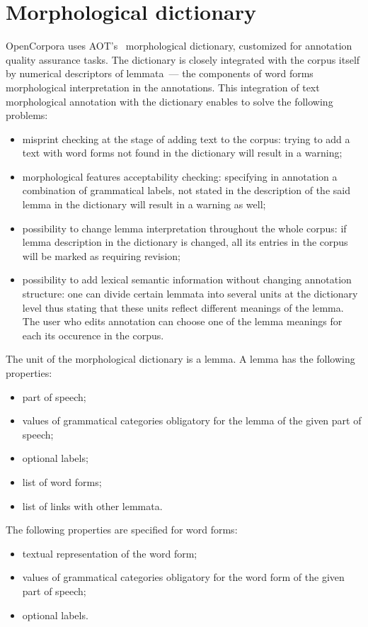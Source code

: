 \documentclass[a4paper]{article}
\begin{document}
\section{Morphological dictionary}
OpenCorpora uses AOT's~\cite{aot} morphological dictionary, customized for annotation quality assurance tasks. The dictionary is closely integrated with the corpus itself by numerical descriptors of lemmata~--- the components of word forms morphological interpretation in the annotations. This integration of text morphological annotation with the dictionary enables to solve the following problems:
\begin{itemize}
\item misprint checking at the stage of adding text to the corpus: trying to add a text with word forms not found in the dictionary will result in a warning;
\item morphological features acceptability checking: specifying in annotation a combination of grammatical labels, not stated in the description of the said lemma in the dictionary will result in a warning as well;
\item possibility to change lemma interpretation throughout the whole corpus: if lemma description in the dictionary is changed, all its entries in the corpus will be marked as requiring revision;
\item possibility to add lexical semantic information without changing annotation structure: one can divide certain lemmata into several units at the dictionary level thus stating that these units reflect different meanings of the lemma. The user who edits annotation can choose one of the lemma meanings for each its occurence in the corpus.
\end{itemize}

The unit of the morphological dictionary is a lemma. A lemma has the following properties:
\begin{itemize}
\item part of speech;
\item values of grammatical categories obligatory for the lemma of the given part of speech;
\item optional labels;
\item list of word forms;
\item list of links with other lemmata.
\end{itemize}

The following properties are specified for word forms:
\begin{itemize}
\item textual representation of the word form;
\item values of grammatical categories obligatory for the word form of the given part of speech;
\item optional labels.
\end{itemize}
\end{document}

